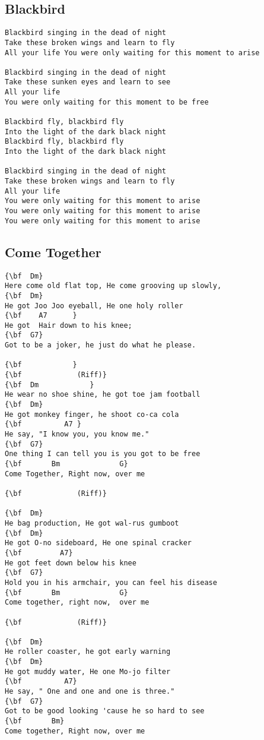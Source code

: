 \documentclass[a4paper]{article}
\begin{document}
\subsection{Blackbird}
\begin{Verbatim}[commandchars=\\\{\}]
Blackbird singing in the dead of night 
Take these broken wings and learn to fly 
All your life You were only waiting for this moment to arise

Blackbird singing in the dead of night 
Take these sunken eyes and learn to see 
All your life 
You were only waiting for this moment to be free

Blackbird fly, blackbird fly 
Into the light of the dark black night
Blackbird fly, blackbird fly 
Into the light of the dark black night

Blackbird singing in the dead of night 
Take these broken wings and learn to fly 
All your life 
You were only waiting for this moment to arise 
You were only waiting for this moment to arise 
You were only waiting for this moment to arise 

\end{Verbatim}
\newpage
\subsection{Come Together}
\begin{Verbatim}[commandchars=\\\{\}]
{\bf  Dm}
Here come old flat top, He come grooving up slowly,
{\bf  Dm}
He got Joo Joo eyeball, He one holy roller 
{\bf  	A7		}
He got  Hair down to his knee;  
{\bf  G7}
Got to be a joker, he just do what he please.

{\bf            }
{\bf  			 (Riff)}
{\bf  Dm 			}
He wear no shoe shine, he got toe jam football
{\bf  Dm}
He got monkey finger, he shoot co-ca cola
{\bf          A7 }
He say, "I know you, you know me."  
{\bf  G7}
One thing I can tell you is you got to be free
{\bf       Bm              G}
Come Together, Right now, over me

{\bf  			 (Riff)}

{\bf  Dm}
He bag production, He got wal-rus gumboot
{\bf  Dm}
He got O-no sideboard, He one spinal cracker
{\bf         A7}
He got feet down below his knee
{\bf  G7}
Hold you in his armchair, you can feel his disease 
{\bf       Bm              G}
Come together, right now,  over me

{\bf  			 (Riff)}

{\bf  Dm}
He roller coaster, he got early warning
{\bf  Dm}
He got muddy water, He one Mo-jo filter
{\bf          A7}
He say, " One and one and one is three."
{\bf  G7}
Got to be good looking 'cause he so hard to see 
{\bf       Bm}
Come together, Right now, over me

\end{Verbatim}
\newpage
\end{document}
